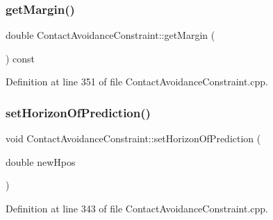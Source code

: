 \hypertarget{classocra_1_1ContactAvoidanceConstraint_acb8dff3c7d62c30edc180e3526ee8f94}{}\label{classocra_1_1ContactAvoidanceConstraint_acb8dff3c7d62c30edc180e3526ee8f94} 
\subsubsection{\texorpdfstring{get\+Margin()}{getMargin()}}
{\footnotesize\ttfamily double Contact\+Avoidance\+Constraint\+::get\+Margin (\begin{DoxyParamCaption}{ }\end{DoxyParamCaption}) const}



Definition at line 351 of file Contact\+Avoidance\+Constraint.\+cpp.

\hypertarget{classocra_1_1ContactAvoidanceConstraint_a667de1446a83d166c7979b6066dd0720}{}\label{classocra_1_1ContactAvoidanceConstraint_a667de1446a83d166c7979b6066dd0720} 
\subsubsection{\texorpdfstring{set\+Horizon\+Of\+Prediction()}{setHorizonOfPrediction()}}
{\footnotesize\ttfamily void Contact\+Avoidance\+Constraint\+::set\+Horizon\+Of\+Prediction (\begin{DoxyParamCaption}\item[{double}]{new\+Hpos }\end{DoxyParamCaption})}



Definition at line 343 of file Contact\+Avoidance\+Constraint.\+cpp.

\hypertarget{classocra_1_1ContactAvoidanceConstraint_a3504dbfab2c8e829bb73960891f4dd01}{}\label{classocra_1_1ContactAvoidanceConstraint_a3504dbfab2c8e829bb73960891f4dd01} 
